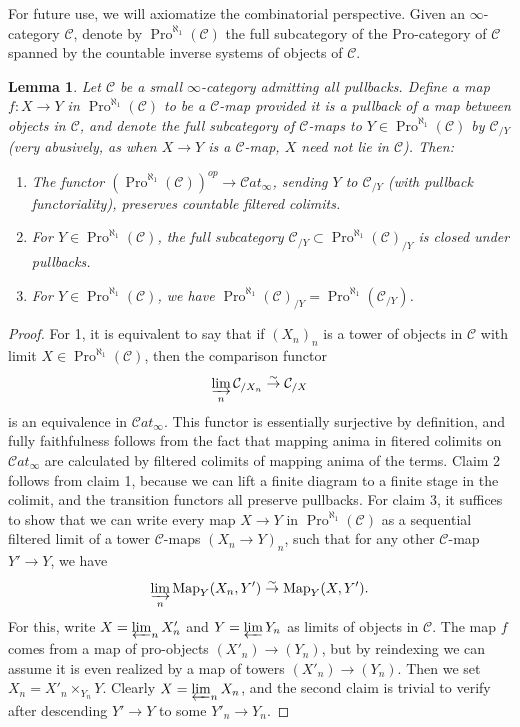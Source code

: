 \documentclass[12pt]{article}
\newtheorem{lemma}[theorem]{Lemma}
\newcommand{\on}{\operatorname}
\begin{document}
For future use, we will axiomatize the combinatorial perspective.  Given an $\infty$-category $\mathcal{C}$, denote by $\on{Pro}^{\aleph_1}(\mathcal{C})$ the full subcategory of the Pro-category of $\mathcal{C}$ spanned by the countable inverse systems of objects of $\mathcal{C}$.

\begin{lemma}\label{prononsense}
Let $\mathcal{C}$ be a small $\infty$-category admitting all pullbacks.  Define a map $f:X\rightarrow Y$ in $\on{Pro}^{\aleph_1}(\mathcal{C})$ to be a \emph{$\mathcal{C}$-map} provided it is a pullback of a map between objects in $\mathcal{C}$, and denote the full subcategory of $\mathcal{C}$-maps to $Y\in \on{Pro}^{\aleph_1}(\mathcal{C})$ by $\mathcal{C}_{/Y}$ (very abusively, as when $X\rightarrow Y$ is a $\mathcal{C}$-map, $X$ need not lie in $\mathcal{C}$).  Then:
\begin{enumerate}
\item The functor $(\on{Pro}^{\aleph_1}(\mathcal{C}))^{op}\rightarrow\mathcal{C}at_\infty$, sending $Y$ to $\mathcal{C}_{/Y}$ (with pullback functoriality), preserves countable filtered colimits.
\item For $Y\in\on{Pro}^{\aleph_1}(\mathcal{C})$, the full subcategory $\mathcal{C}_{/Y}\subset \on{Pro}^{\aleph_1}(\mathcal{C})_{/Y}$  is closed under pullbacks.
\item For $Y\in\on{Pro}^{\aleph_1}(\mathcal{C})$, we have $\on{Pro}^{\aleph_1}(\mathcal{C})_{/Y} = \on{Pro}^{\aleph_1}(\mathcal{C}_{/Y})$.
\end{enumerate}
\end{lemma}
\begin{proof}
For 1, it is equivalent to say that if $(X_n)_n$ is a tower of objects in $\mathcal{C}$ with limit $X \in \on{Pro}^{\aleph_1}(\mathcal{C})$, then the comparison functor
$$\varinjlim_n \mathcal{C}_{/X_n}\overset{\sim}{\rightarrow} \mathcal{C}_{/X}$$
is an equivalence in $\mathcal{C}at_\infty$.  This functor is essentially surjective by definition, and fully faithfulness follows from the fact that mapping anima in fitered colimits on $\mathcal{C}at_\infty$ are calculated by filtered colimits of mapping anima of the terms.
Claim 2 follows from claim 1, because we can lift a finite diagram to a finite stage in the colimit, and the transition functors all preserve pullbacks.
For claim 3, it suffices to show that we can write every map $X\rightarrow Y$ in $\on{Pro}^{\aleph_1}(\mathcal{C})$ as a sequential filtered limit of a tower $\mathcal{C}$-maps $(X_n\rightarrow Y)_n$, such that for any other $\mathcal{C}$-map $Y'\rightarrow Y$, we have
$$\varinjlim_n \on{Map}_Y(X_n,Y')\overset{\sim}{\rightarrow} \on{Map}_Y(X,Y').$$
For this, write $X=\varprojlim_n X'_n$ and $Y=\varprojlim Y_n$ as limits of objects in $\mathcal{C}$.  The map $f$ comes from a map of pro-objects $(X'_n)\rightarrow (Y_n)$, but by reindexing we can assume it is even realized by a map of towers $(X'_n)\rightarrow (Y_n)$.  Then we set $X_n = X'_n\times_{Y_n} Y$.  Clearly $X=\varprojlim_n X_n$, and the second claim is trivial to verify after descending $Y'\rightarrow Y$ to some $Y'_n\rightarrow Y_n$.
\end{proof}
\end{document}
